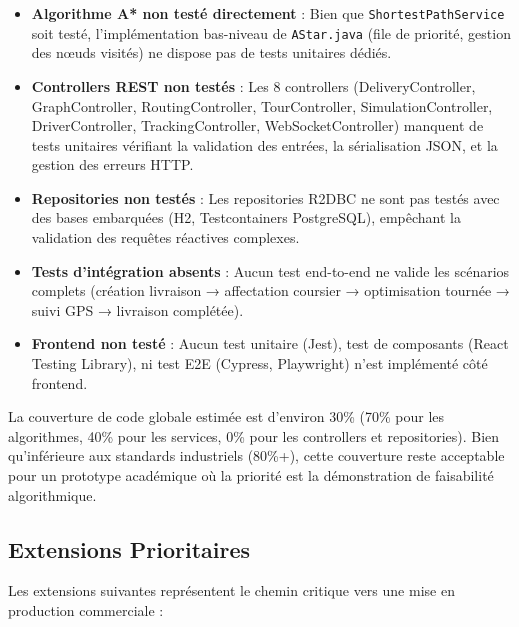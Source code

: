 \begin{itemize}
    \item \textbf{Algorithme A* non testé directement} : Bien que \texttt{ShortestPathService} soit testé, l'implémentation bas-niveau de \texttt{AStar.java} (file de priorité, gestion des nœuds visités) ne dispose pas de tests unitaires dédiés.
    \item \textbf{Controllers REST non testés} : Les 8 controllers (DeliveryController, GraphController, RoutingController, TourController, SimulationController, DriverController, TrackingController, WebSocketController) manquent de tests unitaires vérifiant la validation des entrées, la sérialisation JSON, et la gestion des erreurs HTTP.
    \item \textbf{Repositories non testés} : Les repositories R2DBC ne sont pas testés avec des bases embarquées (H2, Testcontainers PostgreSQL), empêchant la validation des requêtes réactives complexes.
    \item \textbf{Tests d'intégration absents} : Aucun test end-to-end ne valide les scénarios complets (création livraison → affectation coursier → optimisation tournée → suivi GPS → livraison complétée).
    \item \textbf{Frontend non testé} : Aucun test unitaire (Jest), test de composants (React Testing Library), ni test E2E (Cypress, Playwright) n'est implémenté côté frontend.
\end{itemize}

La couverture de code globale estimée est d'environ 30\% (70\% pour les algorithmes, 40\% pour les services, 0\% pour les controllers et repositories). Bien qu'inférieure aux standards industriels (80\%+), cette couverture reste acceptable pour un prototype académique où la priorité est la démonstration de faisabilité algorithmique.

\subsection{Extensions Prioritaires}

Les extensions suivantes représentent le chemin critique vers une mise en production commerciale :

